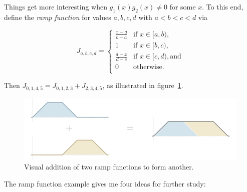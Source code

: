 \documentclass[20pt,]{extarticle}
\begin{document}
Things get more interesting when \(g_1(x) g_2(x) \ne 0\) for some \(x\).
To this end, define the \emph{ramp function} for values \(a,b,c,d\) with
\(a < b < c < d\) via

\[ J_{a,b,c,d} = \begin{cases}
\frac{x - a}{b - a} & \text{if } x \in [a, b), \\
1 & \text{if } x \in [b, c), \\
\frac{d - x}{d - c} & \text{if } x \in [c, d), \text{and} \\
0 & \text{otherwise.} \\
\end{cases}\]

Then \(J_{0,1,4,5} = J_{0,1,2,3} + J_{2,3,4,5}\), as illustrated in
figure~\ref{fig:ramp_fns}.

\begin{figure}
\centering
\includegraphics{images/ramp_fns3.png}
\caption{Visual addition of two ramp functions to form
another.}\label{fig:ramp_fns}
\end{figure}

The ramp function example gives me four ideas for further study:
\end{document}
